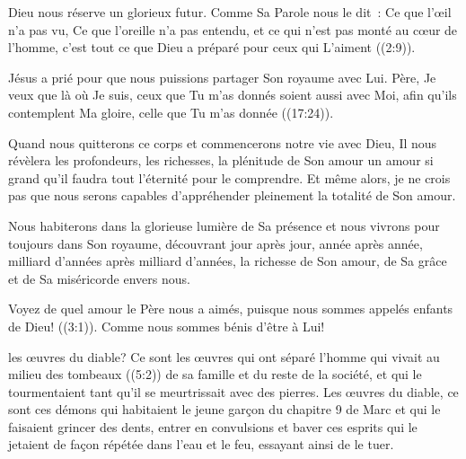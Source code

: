  Dieu nous réserve un glorieux futur.
 Comme Sa Parole nous le dit~: 
 \og Ce que l'œil n'a pas vu, Ce que l'oreille n'a pas entendu,
 et ce qui n'est pas monté au cœur de l'homme,
 c'est tout ce que Dieu a préparé pour ceux qui L'aiment \fg{}
 ((2:9)). 

Jésus a prié pour que nous puissions partager Son royaume avec Lui.
 \og Père, Je veux que là où Je suis, ceux que Tu m'as donnés
 soient aussi avec Moi, afin qu'ils contemplent Ma gloire,
 celle que Tu m'as donnée \fg{} ((17:24)). 


Quand nous quitterons ce corps et commencerons notre vie avec Dieu,
 Il nous révèlera les profondeurs, les richesses, la plénitude de Son amour
 \ocadr un amour si grand qu'il faudra tout l'éternité pour le comprendre.
 Et même alors, je ne crois pas que nous serons capables d'appréhender
 pleinement la totalité de Son amour. 

Nous habiterons dans la glorieuse lumière de Sa présence et nous vivrons
 pour toujours dans Son royaume, découvrant jour après jour,
 année après année, milliard d'années après milliard d'années,
 la richesse de Son amour, de Sa grâce et de Sa miséricorde envers nous. 

\og Voyez de quel amour le Père nous a aimés, puisque nous sommes appelés
 enfants de Dieu! \fg{} ((3:1)).
 Comme nous sommes bénis d'être à Lui! 

\dvrule






 les œuvres du diable?
 Ce sont les œuvres qui ont séparé l'homme qui vivait
 au milieu des tombeaux ((5:2)) de sa famille
 et du reste de la société, et qui le tourmentaient tant
 qu'il se meurtrissait avec des pierres.
 Les œuvres du diable, ce sont ces démons qui habitaient le jeune garçon
 du chapitre 9 de Marc et qui le faisaient grincer des dents,
 entrer en convulsions et baver \ocadr ces esprits qui le jetaient
 de façon répétée dans l'eau et le feu, essayant ainsi de le tuer. 

